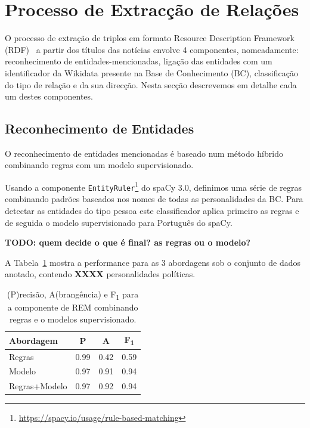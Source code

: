 \documentclass[a4paper, twocolumn, 11pt, twoside]{article}
\begin{document}
\section{Processo de Extracção de Relações}
\label{sec:classifiers}

O processo de extração de triplos em formato Resource Description Framework (RDF)~\citep{schreiber2014primer} a partir dos títulos das notícias envolve 4 componentes, nomeadamente: reconhecimento de entidades-mencionadas, ligação das entidades com um identificador da Wikidata presente na Base de Conhecimento (BC), classificação do tipo de relação e da sua direcção. Nesta secção descrevemos em detalhe cada um destes componentes.


\subsection{Reconhecimento de Entidades}
\label{subsec:ner}

O reconhecimento de entidades mencionadas é baseado num método híbrido combinando regras com um modelo supervisionado. 

Usando a componente \texttt{EntityRuler}\footnote{\url{https://spacy.io/usage/rule-based-matching}} do spaCy 3.0, definimos uma série de regras combinando padrões baseados nos nomes de todas as personalidades da BC. Para detectar as entidades do tipo pessoa este classificador aplica primeiro as regras e de seguida o modelo supervisionado para Português do spaCy.

\textbf{TODO: quem decide o que é final? as regras ou o modelo?}

A Tabela~\ref{tab:results_ner} mostra a performance para as 3 abordagens sob o conjunto de dados anotado, contendo {\bf XXXX} personalidades políticas.

\begin{table}[!h]
    \begin{center}
    \begin{tabular}{l ccc}
		{\bf Abordagem}  & {\bf P} & {\bf A} & {\bf F\textsubscript{1}} \\
        \hline
        Regras           &  0.99     &  0.42     & 		0.59		\\
        Modelo           &  0.97     &  0.91     & 		0.94		\\
		Regras+Modelo    &  0.97     &  0.92     & 		0.94		\\
    \end{tabular}
	\caption{ (P)recisão, A(brangência) e F\textsubscript{1} para a componente de REM combinando regras e o modelos supervisionado.}	
	\label{tab:results_ner}
	\end{center}
\end{table}
\end{document}
